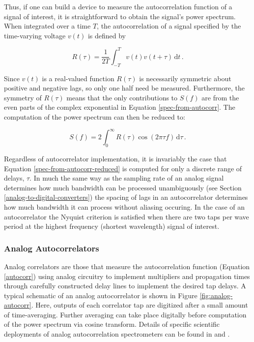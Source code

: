 \documentclass{ws-rv961x669}
\begin{document}
Thus, if one can build a device to measure the autocorrelation function of a signal of interest, it is straightforward to obtain the signal's power spectrum.
When integrated over a time $T$, the autocorrelation of a signal specified by the time-varying voltage $v(t)$ is defined by 

\begin{equation}
\label{autocorr}
 R(\tau) = \frac{1}{2T} \int_{-T}^{T} v(t)v(t+\tau) \,\mathrm{d}t \,.
\end{equation}

Since $v(t)$ is a real-valued function $R(\tau)$ is necessarily symmetric about positive and negative lags, so only one half need be measured. Furthermore, the symmetry of $R(\tau)$ means that the only contributions to $S(f)$ are from the even parts of the complex exponential in Equation \ref{spec-from-autocorr}. The computation of the power spectrum can then be reduced to:

\begin{equation}
\label{spec-from-autocorr-reduced}
 S(f) = 2\int_{0}^{\infty} R(\tau)\cos{(2\pi \tau f)} \,\mathrm{d}\tau \,.
\end{equation}

Regardless of autocorrelator implementation, it is invariably the case that Equation \ref{spec-from-autocorr-reduced} is computed for only a discrete range of delays, $\tau$. In much the same way as the sampling rate of an analog signal determines how much bandwidth can be processed unambiguously (see Section \ref{analog-to-digital-converters}) the spacing of lags in an autocorrelator determines how much bandwidth it can process without aliasing occuring. In the case of an autocorrelator the Nyquist criterion is satisfied when there are two taps per wave period at the highest frequency (shortest wavelength) signal of interest. 


\subsubsection{Analog Autocorrelators}\label{analog-autocorrelators}

Analog correlators are those that measure the autocorrelation function (Equation \ref{autocorr}) using analog circuitry to implement multipliers and propagation times through carefully constructed delay lines to implement the desired tap delays.
A typical schematic of an analog autocorrelator is shown in Figure \ref{fig:analog-autocorr}. Here, outputs of each correlator tap are digitized after a small amount of time-averaging. Further averaging can take place digitally before computation of the power spectrum via cosine transform. Details of specific scientific deployments of analog autocorrelation spectrometers can be found in \cite{Erickson2007} and \cite{Harris1998}.
\end{document}
